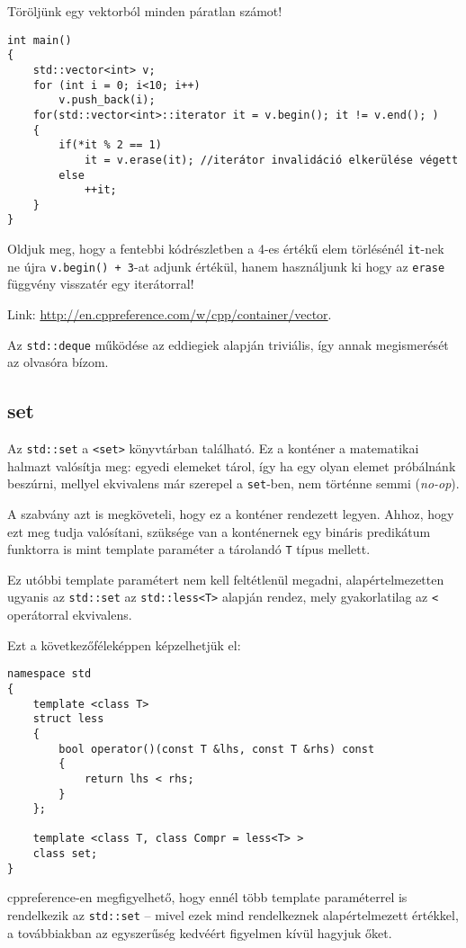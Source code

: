 \documentclass[../cpp_book/cpp_book.tex]{subfiles}
\begin{document}
	\smallskip
	Töröljünk egy vektorból minden páratlan számot!
	\begin{lstlisting}
int main()
{
	std::vector<int> v;
	for (int i = 0; i<10; i++)
		v.push_back(i);
	for(std::vector<int>::iterator it = v.begin(); it != v.end(); )
	{
		if(*it % 2 == 1)
			it = v.erase(it); //iterátor invalidáció elkerülése végett
		else
			++it;
	}
}
	\end{lstlisting}
	\begin{note}
		Oldjuk meg, hogy a fentebbi kódrészletben a 4-es értékű elem törlésénél \texttt{it}-nek ne újra \texttt{v.begin() + 3}-at adjunk értékül, hanem használjunk ki hogy az \texttt{erase} függvény visszatér egy iterátorral!
	\end{note}
	Link: \url{http://en.cppreference.com/w/cpp/container/vector}.
	
	\begin{note}
		Az \texttt{std::deque} működése az eddiegiek alapján triviális, így annak megismerését az olvasóra bízom.
	\end{note}
	\subsection{set}
	
	Az \texttt{std::set} a \texttt{<set>} könyvtárban található. Ez a konténer a matematikai halmazt valósítja meg: egyedi elemeket tárol, így ha egy olyan elemet próbálnánk beszúrni, mellyel ekvivalens már szerepel a \texttt{set}-ben, nem történne semmi (\textit{no-op}). 
	
	A szabvány azt is megköveteli, hogy ez a konténer rendezett legyen. Ahhoz, hogy ezt meg tudja valósítani, szüksége van a konténernek egy bináris predikátum funktorra is mint template paraméter a tárolandó \texttt{T} típus mellett.
	\smallskip
	
	Ez utóbbi template paramétert nem kell feltétlenül megadni, alapértelmezetten ugyanis az \texttt{std::set} az \texttt{std::less<T>} alapján rendez, mely gyakorlatilag az \texttt{<} operátorral ekvivalens.
	\smallskip
	
	Ezt a következőféleképpen képzelhetjük el:
	\begin{lstlisting}
namespace std
{
	template <class T>
	struct less
	{
		bool operator()(const T &lhs, const T &rhs) const
		{
			return lhs < rhs;
		}
	};

	template <class T, class Compr = less<T> >
	class set;
}
	\end{lstlisting}
	\begin{note}
		cppreference-en megfigyelhető, hogy ennél több template paraméterrel is rendelkezik az \texttt{std::set} -- mivel ezek mind rendelkeznek alapértelmezett értékkel, a továbbiakban az egyszerűség kedvéért figyelmen kívül hagyjuk őket.
	\end{note}
	
\end{document}

